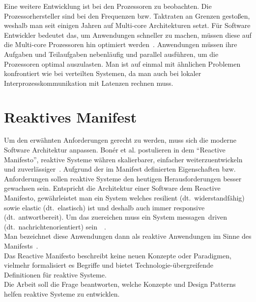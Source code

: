 Eine weitere Entwicklung ist bei den Prozessoren zu beobachten. Die Prozessorhersteller sind bei den Frequenzen bzw. Taktraten an Grenzen gestoßen, weshalb man seit einigen Jahren auf Multi-core Architekturen setzt. Für Software Entwickler bedeutet das, um Anwendungen schneller zu machen, müssen diese auf die Multi-core Prozessoren hin optimiert werden~\cite[S. 15]{butcher_seven_2014}. Anwendungen müssen ihre Aufgaben und Teilaufgaben nebenläufig und parallel ausführen, um die Prozessoren optimal auszulasten. Man ist auf einmal mit ähnlichen Problemen konfrontiert wie bei verteilten Systemen, da man auch bei lokaler Interprozesskommunikation mit Latenzen rechnen muss.

\pagebreak

\section{Reaktives Manifest}
Um den erwähnten Anforderungen gerecht zu werden, muss sich die moderne Software Architektur anpassen. Bonér et al. postulieren in dem \enquote{Reactive Manifesto}, reaktive Systeme währen skalierbarer, einfacher weiterzuentwickeln und zuverlässiger~\cite{boner_reactive_2014}. Aufgrund der im Manifest definierten Eigenschaften bzw. Anforderungen sollen reaktive Systeme den heutigen Herausforderungen besser gewachsen sein. Entspricht die Architektur einer Software dem Reactive Manifesto, gewährleistet man ein System welches resilient (dt.~widerstandfähig) sowie elastic (dt.~elastisch) ist und deshalb auch immer responsive (dt.~antwortbereit). Um das zuereichen muss ein System messagen~driven (dt.~nachrichtenorientiert) sein~\cite[S.~5]{vernon_reactive_2016}~\cite{boner_reactive_2014}.\\
Man bezeichnet diese Anwendungen dann als reaktive Anwendungen im Sinne des Manifests~\cite{boner_reactive_2014}.\\
Das Reactive Manifesto beschreibt keine neuen Konzepte oder Paradigmen, vielmehr formalisiert es Begriffe und bietet Technologie-übergreifende Definitionen für reaktive Systeme.\\
Die Arbeit soll die Frage beantworten, welche Konzepte und Design Patterns helfen reaktive Systeme zu entwicklen.

